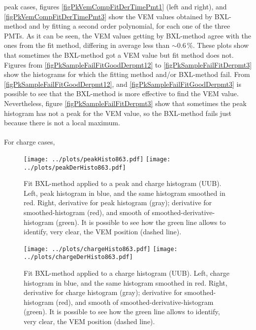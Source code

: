 \documentclass[twoside, final, 10pt]{articleMine}
\begin{document}
peak cases, figures \ref{figPkVemCompFitDerTimePmt1} (left and
right), and \ref{figPkVemCompFitDerTimePmt3} show the VEM values
obtained by BXL-method and by fitting a second order polynomial,
for each one of the three PMTs. As it can be seen, the VEM values
getting by BXL-method agree with the ones from the fit method,
differing in average less than $\sim0.6$\,\%. These plots show
that sometimes the BXL-method got a VEM value but fit method does
not. Figures from \ref{figPkSampleFailFitGoodDerpmt12} to
\ref{figPkSampleFailFitDerpmt3} show the histograms for which the
fitting method and/or BXL-method fail. From
\ref{figPkSampleFailFitGoodDerpmt12}, and
\ref{figPkSampleFailFitGoodDerpmt3} is possible to see that the
BXL-method is more effective to find the VEM value. Nevertheless,
figure \ref{figPkSampleFailFitDerpmt3} show that sometimes the
peak histogram has not a peak for the VEM value, so the
BXL-method fails just because there is not a local
maximum.\\\\For charge cases, 
\clearpage

\begin{figure}[!tbh]
  \centering
  \subfigure
  {
    \texttt{[image: ../plots/peakHisto863.pdf]}
    \texttt{[image: ../plots/peakDerHisto863.pdf]}
  }
  \caption{Fit BXL-method applied to a peak and charge histogram
  (UUB). Left, peak histogram in blue, and the same
  histogram smoothed in red. Right, derivative for peak histogram
  (gray); derivative for smoothed-histogram (red), and smooth of
  smoothed-derivative-histogram (green). It is possible to see
  how the green line allows to identify, very clear, the VEM
  position (dashed line).}
  \label{figBxlMethodPeak}
\end{figure}

\begin{figure}[!tbh]
  \centering
  \subfigure
  {
    \texttt{[image: ../plots/chargeHisto863.pdf]}
    \texttt{[image: ../plots/chargeDerHisto863.pdf]}
  }
  \caption{Fit BXL-method applied to a charge histogram (UUB).
  Left, charge histogram in blue, and the same histogram smoothed
  in red. Right, derivative for charge histogram (gray);
  derivative for smoothed-histogram (red), and smooth of
  smoothed-derivative-histogram (green). It is possible to see
  how the green line allows to identify, very clear, the VEM
  position (dashed line).}
  \label{figBxlMethodCharge}
\end{figure}
\clearpage
\end{document}
